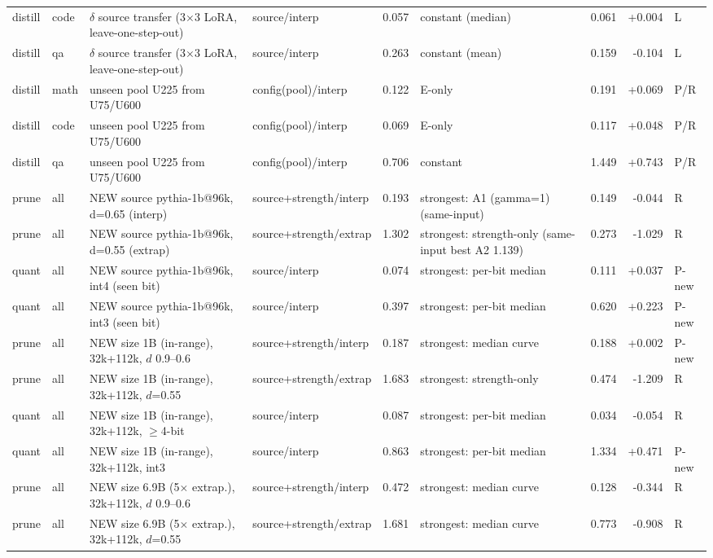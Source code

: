 \begin{table}
\begin{tabular}{@{}llp{4.6cm}lrp{3.2cm}rrl@{}}
distill & code & $\delta$ source transfer (3$\times$3 LoRA, leave-one-step-out) & source/interp & 0.057 & constant (median) & 0.061 & +0.004 & L \\
distill & qa & $\delta$ source transfer (3$\times$3 LoRA, leave-one-step-out) & source/interp & 0.263 & constant (mean) & 0.159 & -0.104 & L \\
distill & math & unseen pool U225 from U75/U600 & config(pool)/interp & 0.122 & E-only & 0.191 & +0.069 & P/R \\
distill & code & unseen pool U225 from U75/U600 & config(pool)/interp & 0.069 & E-only & 0.117 & +0.048 & P/R \\
distill & qa & unseen pool U225 from U75/U600 & config(pool)/interp & 0.706 & constant & 1.449 & +0.743 & P/R \\
\midrule
prune & all & NEW source pythia-1b@96k, d=0.65 (interp) & source+strength/interp & 0.193 & strongest: A1 (gamma=1) (same-input) & 0.149 & -0.044 & R \\
prune & all & NEW source pythia-1b@96k, d=0.55 (extrap) & source+strength/extrap & 1.302 & strongest: strength-only (same-input best A2 1.139) & 0.273 & -1.029 & R \\
\midrule
quant & all & NEW source pythia-1b@96k, int4 (seen bit) & source/interp & 0.074 & strongest: per-bit median & 0.111 & +0.037 & P-new \\
quant & all & NEW source pythia-1b@96k, int3 (seen bit) & source/interp & 0.397 & strongest: per-bit median & 0.620 & +0.223 & P-new \\
\midrule
prune & all & NEW size 1B (in-range), 32k+112k, $d$ 0.9--0.6 & source+strength/interp & 0.187 & strongest: median curve & 0.188 & +0.002 & P-new \\
prune & all & NEW size 1B (in-range), 32k+112k, $d$=0.55 & source+strength/extrap & 1.683 & strongest: strength-only & 0.474 & -1.209 & R \\
\midrule
quant & all & NEW size 1B (in-range), 32k+112k, $\ge$4-bit & source/interp & 0.087 & strongest: per-bit median & 0.034 & -0.054 & R \\
quant & all & NEW size 1B (in-range), 32k+112k, int3 & source/interp & 0.863 & strongest: per-bit median & 1.334 & +0.471 & P-new \\
\midrule
prune & all & NEW size 6.9B (5$\times$ extrap.), 32k+112k, $d$ 0.9--0.6 & source+strength/interp & 0.472 & strongest: median curve & 0.128 & -0.344 & R \\
prune & all & NEW size 6.9B (5$\times$ extrap.), 32k+112k, $d$=0.55 & source+strength/extrap & 1.681 & strongest: median curve & 0.773 & -0.908 & R \\

\end{tabular}
\end{table}

